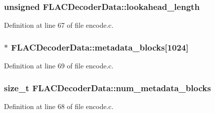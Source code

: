 \subsubsection[{\texorpdfstring{lookahead\+\_\+length}{lookahead_length}}]{\setlength{\rightskip}{0pt plus 5cm}unsigned F\+L\+A\+C\+Decoder\+Data\+::lookahead\+\_\+length}\hypertarget{struct_f_l_a_c_decoder_data_a92020443b708e30df0b9cb3caa692529}{}\label{struct_f_l_a_c_decoder_data_a92020443b708e30df0b9cb3caa692529}


Definition at line 67 of file encode.\+c.

\subsubsection[{\texorpdfstring{metadata\+\_\+blocks}{metadata_blocks}}]{$\ast$ F\+L\+A\+C\+Decoder\+Data\+::metadata\+\_\+blocks\mbox{[}1024\mbox{]}}\hypertarget{struct_f_l_a_c_decoder_data_acf28dcfe70826a45eddef676a6afd810}{}\label{struct_f_l_a_c_decoder_data_acf28dcfe70826a45eddef676a6afd810}


Definition at line 69 of file encode.\+c.

\subsubsection[{\texorpdfstring{num\+\_\+metadata\+\_\+blocks}{num_metadata_blocks}}]{\setlength{\rightskip}{0pt plus 5cm}size\+\_\+t F\+L\+A\+C\+Decoder\+Data\+::num\+\_\+metadata\+\_\+blocks}\hypertarget{struct_f_l_a_c_decoder_data_acd831130440f16b4bed1812a67118b68}{}\label{struct_f_l_a_c_decoder_data_acd831130440f16b4bed1812a67118b68}


Definition at line 68 of file encode.\+c.

